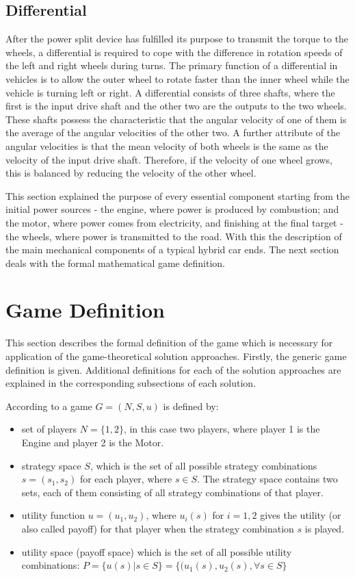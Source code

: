 \subsection{Differential}
After the power split device has fulfilled its purpose to transmit the torque to the wheels, a differential is required to cope with the difference in rotation speeds of the left and right wheels during turns. The primary function of a differential in vehicles is to allow the outer wheel to rotate faster than the inner wheel while the vehicle is turning left or right. A differential consists of three shafts, where the first is the input drive shaft and the other two are the outputs to the two wheels. These shafts possess the characteristic that the angular velocity of one of them is the average of the angular velocities of the other two. A further attribute of the angular velocities is that the mean velocity of both wheels is the same as the velocity of the input drive shaft. Therefore, if the velocity of one wheel grows, this is balanced by reducing the velocity of the other wheel.

This section explained the purpose of every essential component starting from the initial power sources - the engine, where power is produced by combustion; and the motor, where power comes from electricity, and finishing at the final target - the wheels, where power is transmitted to the road. With this the description of the main mechanical components of a typical hybrid car ends. The next section deals with the formal mathematical game definition.

\section{Game Definition}
This section describes the formal definition of the game which is necessary for application of the game-theoretical solution approaches. Firstly, the generic game definition is given. Additional definitions for each of the solution approaches are explained in the corresponding subsections of each solution.

According to \citet{holler2006einfuhrung} a game $G = (N,S,u)$ is defined by:
\begin{itemize}
\item
set of players $N = \{1,2\}$, in this case two players, where player 1 is the Engine and player 2 is the Motor.
\item
strategy space $S$, which is the set of all possible strategy combinations $s=(s_1,s_2)$ for each player, where $s \in S$. The strategy space contains two sets, each of them consisting of all strategy combinations of that player.
\item
utility function $u = (u_1,u_2)$, where $u_i(s)$ for $i=1,2$ gives the utility (or also called payoff) for that player when the strategy combination $s$ is played.
\item
utility space (payoff space) which is the set of all possible utility combinations:
$P = \{u(s)|s \in S\} = \{(u_1(s),u_2(s),  \forall s \in S\}$
\end{itemize} 

